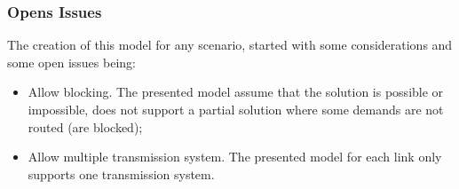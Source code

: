 \vspace{13pt}
\subsubsection{Opens Issues}

The creation of this model for any scenario, started with some considerations and some open issues being:

\begin{itemize}
  \item Allow blocking.
  \subitem The presented model assume that the solution is possible or impossible, does not support a partial solution where some demands are not routed (are blocked);
  \item Allow multiple transmission system.
  \subitem The presented model for each link only supports one transmission system.
\end{itemize} 